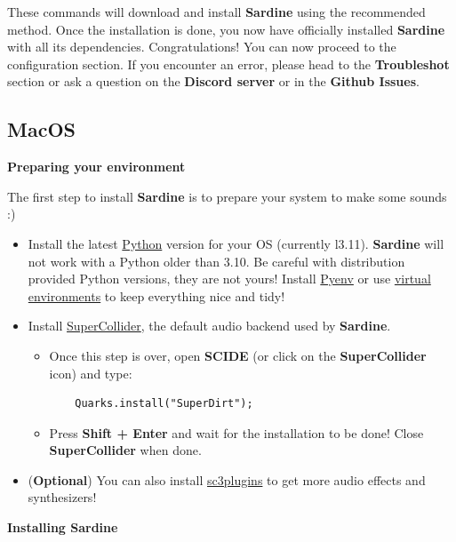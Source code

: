 \documentclass[11pt]{article}
\begin{document}
These commands will download and install \textbf{Sardine} using the recommended method. Once the installation is done, you now have officially installed \textbf{Sardine} with all its dependencies. Congratulations! You can now proceed to the configuration section. If you encounter an error, please head to the \textbf{Troubleshot} section or ask a question on the \textbf{Discord server} or in the \textbf{Github Issues}.

\subsection{MacOS}
\label{sec:org298ebe5}

\textbf{Preparing your environment}

The first step to install \textbf{Sardine} is to prepare your system to make some sounds :)

\begin{itemize}
\item Install the latest \href{https://www.python.org/}{Python} version for your OS (currently l3.11). \textbf{Sardine} will not work with a Python older than 3.10. Be careful with distribution provided Python versions, they are not yours! Install \href{https://github.com/pyenv/pyenv}{Pyenv} or use \href{https://docs.python.org/3/library/venv.html}{virtual environments} to keep everything nice and tidy!
\item Install \href{https://supercollider.github.io/}{SuperCollider}, the default audio backend used by \textbf{Sardine}.
\begin{itemize}
\item Once this step is over, open \textbf{SCIDE} (or click on the \textbf{SuperCollider} icon) and type:
\begin{verbatim}
    Quarks.install("SuperDirt");
\end{verbatim}
\item Press \textbf{Shift + Enter} and wait for the installation to be done! Close \textbf{SuperCollider} when done.
\end{itemize}
\item (\textbf{\textbf{Optional}}) You can also install \href{https://github.com/supercollider/sc3-plugins}{sc3plugins} to get more audio effects and synthesizers!
\end{itemize}

\textbf{Installing Sardine}
\end{document}
